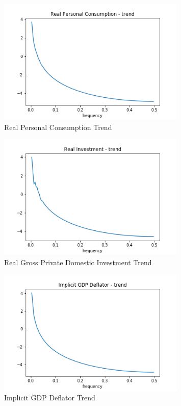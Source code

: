 \documentclass[letterpaper,11pt]{article}
\theoremstyle{definition}
\begin{document}
\begin{spacing}{1.5}
\begin{Exercise}
				\begin{figure}[H]
					\caption{Real Personal Consumption Trend}
					\label{fig:real_PCtr}
					\includegraphics[width=0.8\textwidth]{Real_PC_Trend.png}
				\end{figure}

				\begin{figure}[H]
					\caption{Real Gross Private Domestic Investment Trend}
					\label{fig:real_INtr}
					\includegraphics[width=0.8\textwidth]{Real_IN_Trend.png}
				\end{figure}

				\begin{figure}[H]
					\caption{Implicit GDP Deflator Trend}
					\label{fig:GDP_deflatortr}
					\includegraphics[width=0.8\textwidth]{Real_GDPD_Trend.png}
				\end{figure}
    \end{Exercise}


\end{spacing}
\end{document}
